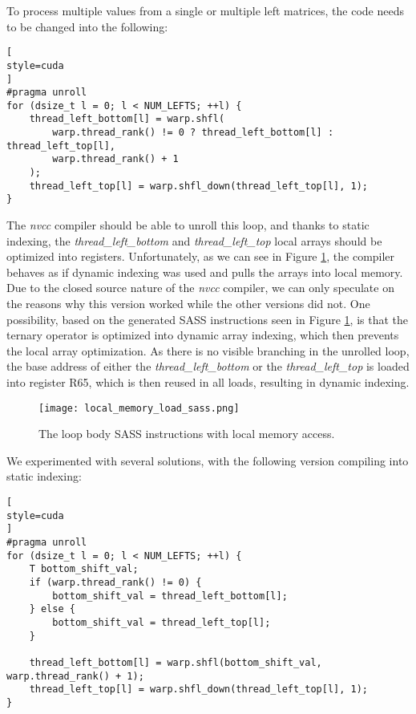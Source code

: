 To process multiple values from a single or multiple left matrices, the code needs to be changed into the following:

\begin{lstlisting}[
style=cuda
]
#pragma unroll
for (dsize_t l = 0; l < NUM_LEFTS; ++l) {
	thread_left_bottom[l] = warp.shfl(
		warp.thread_rank() != 0 ? thread_left_bottom[l] : thread_left_top[l],
		warp.thread_rank() + 1
	);
	thread_left_top[l] = warp.shfl_down(thread_left_top[l], 1);
}
\end{lstlisting}

The \textit{nvcc} compiler should be able to unroll this loop, and thanks to static indexing, the \textit{thread\_left\_bottom} and \textit{thread\_left\_top} local arrays should be optimized into registers. Unfortunately, as we can see in Figure \ref{fig:local_memory_load_sass}, the compiler behaves as if dynamic indexing was used and pulls the arrays into local memory. 
Due to the closed source nature of the \textit{nvcc} compiler, we can only speculate on the reasons why this version worked while the other versions did not. One possibility, based on the generated SASS instructions seen in Figure \ref{fig:local_memory_load_sass}, is that the ternary operator is optimized into dynamic array indexing, which then prevents the local array optimization. As there is no visible branching in the unrolled loop, the base address of either the \textit{thread\_left\_bottom} or the \textit{thread\_left\_top} is loaded into register R65, which is then reused in all loads, resulting in dynamic indexing. 

\begin{figure}[ht]
	\centering
	\texttt{[image: local\_memory\_load\_sass.png]}
	\caption{The loop body SASS instructions with local memory access.}
	\label{fig:local_memory_load_sass}
\end{figure}

We experimented with several solutions, with the following version compiling into static indexing:

\begin{lstlisting}[
style=cuda
]
#pragma unroll
for (dsize_t l = 0; l < NUM_LEFTS; ++l) {
	T bottom_shift_val;
	if (warp.thread_rank() != 0) {
		bottom_shift_val = thread_left_bottom[l];
	} else {
		bottom_shift_val = thread_left_top[l];
	}

	thread_left_bottom[l] = warp.shfl(bottom_shift_val, warp.thread_rank() + 1);
	thread_left_top[l] = warp.shfl_down(thread_left_top[l], 1);
}
\end{lstlisting}



